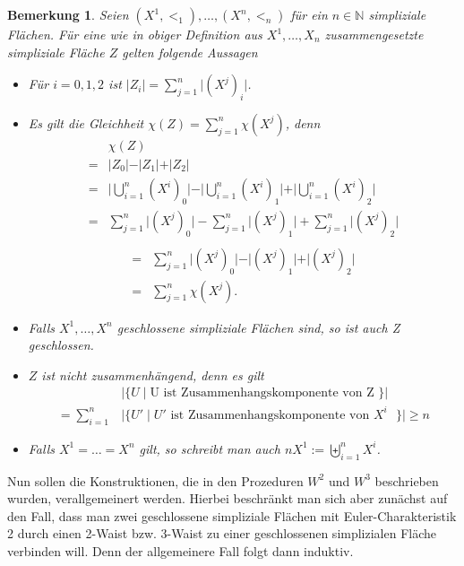 \documentclass[12pt,titlepage,twoside,cleardoublepage]{article}
\theoremstyle{nummermitklammern}
\newtheorem{bemerkung}[temp]{Bemerkung}
\newtheorem{bemerkung}[zahl]{Bemerkung}
\numberwithin{equation}{section}
\begin{document}
\begin{bemerkung}
 Seien $(X^1,<_1), \ldots,(X^n,<_n)$ für ein $n \in \mathbb{N}$ simpliziale Flächen. 
 Für eine wie in obiger Definition aus $X^1,\ldots,X_n$ zusammengesetzte simpliziale Fläche $Z$ gelten folgende Aussagen
\begin{itemize}
\item Für $i=0,1,2$ ist $\vert Z_i\vert= \sum_{j=1}^n \vert (X^j)_i\vert$. 
\item  Es gilt die Gleichheit $\chi(Z)=\sum_{j=1}^n \chi(X^j)$, denn 
\begin{align*}
&\chi(Z)\\
=&\vert Z_0 \vert-\vert Z_1 \vert +\vert Z_2 \vert \\
=& \vert \bigcup\limits_{i=1}^{n} (X^i)_0\vert-\vert \bigcup\limits_{i=1}^{n} (X^i)_1\vert+\vert \bigcup\limits_{i=1}^{n} (X^i)_2\vert\\
=&\sum_{j=1}^n \vert (X^j)_0\vert-\sum_{j=1}^n \vert (X^j)_1\vert+\sum_{j=1}^n \vert (X^j)_2\vert\\
\end{align*}
\begin{align*}
=&\sum_{j=1}^n \vert (X^j)_0\vert-\vert (X^j)_1\vert+\vert (X^j)_2\vert\\
=&\sum_{j=1}^n \chi(X^j).
\end{align*}
\item Falls $X^1,\ldots,X^n$ geschlossene simpliziale Flächen sind, so ist auch Z geschlossen.
\item $Z$ ist nicht zusammenhängend, denn es gilt 
\begin{align*}
&\vert \{ U \mid \text{U ist Zusammenhangskomponente von Z } \} \vert \\
=\sum_{i=1}^n &\vert \{U' \mid U' \text{ ist Zusammenhangskomponente von $X^i$ } \}\vert \geq  n
\end{align*}
\item Falls $X^1= \ldots =X^n$  gilt, so schreibt man auch $n X^1 :=\biguplus\limits_{i=1}^{n} X^i$.
\end{itemize}
\end{bemerkung}

Nun sollen die Konstruktionen, die in den Prozeduren $W^2$ und $W^3$ beschrieben wurden, verallgemeinert werden. Hierbei beschränkt man sich aber zunächst auf den Fall, dass man zwei geschlossene simpliziale Flächen mit Euler-Charakteristik 2 durch einen 2-Waist bzw. 3-Waist zu einer geschlossenen simplizialen Fläche verbinden will. Denn der allgemeinere Fall folgt dann induktiv.
\end{document}
